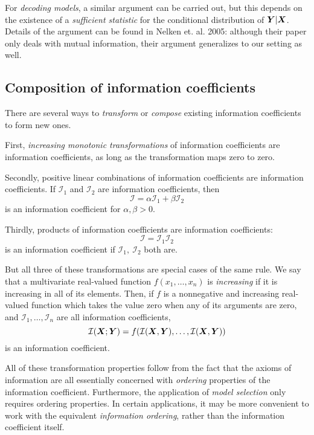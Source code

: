 \documentclass[12pt]{article}
\begin{document}
For \emph{decoding models}, a similar argument can be carried out, but
this depends on the existence of a \emph{sufficient statistic} for the
conditional distribution of $\boldsymbol{Y}|\boldsymbol{X}$.  Details of the argument can be
found in Nelken et. al. 2005: although their paper only deals with
mutual information, their argument generalizes to our setting as well.

\subsection{Composition of information coefficients}

There are several ways to \emph{transform} or \emph{compose} existing
information coefficients to form new ones.  

First, \emph{increasing monotonic transformations} of information
coefficients are information coefficients, as long as the
transformation maps zero to zero.  

Secondly, positive linear combinations of information coefficients are
information coefficients.  If $\mathcal{I}_1$ and $\mathcal{I}_2$ are information coefficients, then
\[
\mathcal{I} = \alpha \mathcal{I}_1 + \beta \mathcal{I}_2
\]
is an information coefficient for $\alpha, \beta > 0$.

Thirdly, products of information coefficients are information coefficients:
\[
\mathcal{I} = \mathcal{I}_1 \mathcal{I}_2
\]
is an information coefficient if $\mathcal{I}_1,\ \mathcal{I}_2$ both are.

But all three of these transformations are special cases of the same
rule.  We say that a multivariate real-valued function $f(x_1,\hdots,
x_n)$ is \emph{increasing}
 if it is increasing in all of its elements.  Then, if $f$ is a
nonnegative and increasing real-valued function which takes the value
zero when any of its arguments are zero, and
$\mathcal{I}_1,\hdots, \mathcal{I}_n$ are all information
coefficients,
\[
\mathcal{I}(\boldsymbol{X}; \boldsymbol{Y}) = f(\mathcal{I}(\boldsymbol{X}, \boldsymbol{Y}),\hdots, \mathcal{I}(\boldsymbol{X}, \boldsymbol{Y}))
\]
is an information coefficient.

All of these transformation properties follow from the fact that the
axioms of information are all essentially concerned
with \emph{ordering} properties of the information coefficient.
Furthermore, the application of \emph{model selection} only requires
ordering properties. In certain applications, it may be more
convenient to work with the equivalent \emph{information ordering},
rather than the information coefficient itself.
\end{document}
